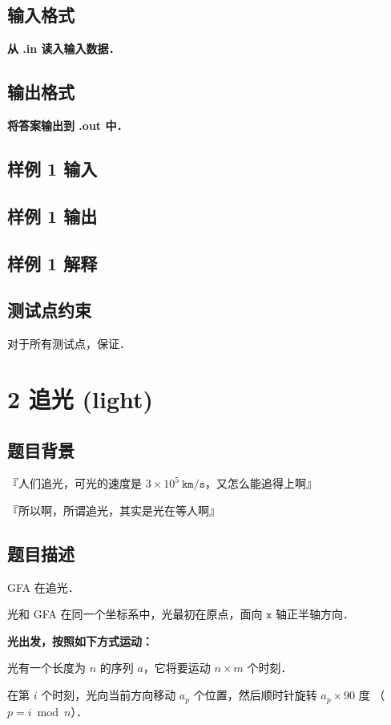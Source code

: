 	\subsection*{输入格式}
	\textbf{从 .in 读入输入数据．}
	\subsection*{输出格式}
	\textbf{将答案输出到 .out 中．}
	\subsection*{样例 1 输入}
	\subsection*{样例 1 输出}
	\subsection*{样例 1 解释}
	\subsection*{测试点约束}
	对于所有测试点，保证．
	\newpage
	\section*{2 追光 (light)}
	\subsection*{题目背景}
	\begin{center}
		\begin{framed}
			『人们追光，可光的速度是 $3 \times 10^5\ \texttt{km/s}$，又怎么能追得上啊』
			
			『所以啊，所谓追光，其实是光在等人啊』
		\end{framed}
	\end{center}
	\subsection*{题目描述}
	
	GFA 在追光．
	
	光和 GFA 在同一个坐标系中，光最初在原点，面向 $\texttt{x}$ 轴正半轴方向．
	
	\textbf{光出发，按照如下方式运动：}
	
	光有一个长度为 $n$ 的序列 $a$，它将要运动 $n \times m$ 个时刻．
	
	在第 $i$ 个时刻，光向当前方向移动 $a_p$ 个位置，然后顺时针旋转 $a_p \times 90$ 度 （$p = i \bmod n$）．
	

